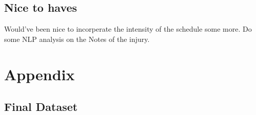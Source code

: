 \documentclass{article}
\begin{document}
\subsection*{Nice to haves}

Would've been nice to incorperate the intensity of the schedule some more.
Do some NLP analysis on the Notes of the injury.

\newpage
\label{appendix:start}\section*{Appendix}

\subsection*{Final Dataset}
\end{document}
